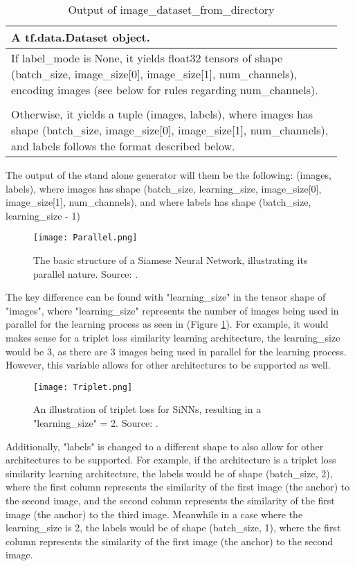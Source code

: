 \documentclass[
	letterpaper, %
	10pt, %
	unnumberedsections, %
	twoside, %
]{LTJournalArticle}
\begin{document}
\begin{table}[hbt!] %
	\caption{Output of image\_dataset\_from\_directory}
	\centering
	\begin{tabular}{p{0.95\linewidth}}
		\toprule
		A tf.data.Dataset object. \\
		\midrule
        If label\_mode is None, it yields float32 tensors of shape (batch\_size, image\_size[0], image\_size[1], num\_channels), encoding images (see below for rules regarding num\_channels). \\
        \\
        Otherwise, it yields a tuple (images, labels), where images has shape (batch\_size, image\_size[0], image\_size[1], num\_channels), and labels follows the format described below. \\
		\bottomrule
	\end{tabular}
	\label{tab:output}
\end{table}

The output of the stand alone generator will them be the following: (images, labels), where images has shape (batch\_size, learning\_size, image\_size[0], image\_size[1], num\_channels), and where labels has shape (batch\_size, learning\_size - 1)

\begin{figure} %
	\texttt{[image: Parallel.png]}
	\caption{The basic structure of a Siamese Neural Network, illustrating its parallel nature. Source: \autocite{craeymeersch}.}
	\label{fig:parallel}
\end{figure}

The key difference can be found with "learning\_size" in the tensor shape of "images", where "learning\_size" represents the number of images being used in parallel for the learning process as seen in (Figure \ref{fig:parallel}). For example, it would makes sense for a triplet loss similarity learning architecture, the learning\_size would be 3, as there are 3 images being used in parallel for the learning process. However, this variable allows for other architectures to be supported as well. 

\begin{figure} %
	\texttt{[image: Triplet.png]}
	\caption{An illustration of triplet loss for SiNNs, resulting in a "learning\_size" = 2. Source: \autocite{craeymeersch}.}
	\label{fig:triplet}
\end{figure}

Additionally, "labels" is changed to a different shape to also allow for other architectures to be supported. For example, if the architecture is a triplet loss similarity learning architecture, the labels would be of shape (batch\_size, 2), where the first column represents the similarity of the first image (the anchor) to the second image, and the second column represents the similarity of the first image (the anchor) to the third image. Meanwhile in a case where the learning\_size is 2, the labels would be of shape (batch\_size, 1), where the first column represents the similarity of the first image (the anchor) to the second image.
\end{document}
